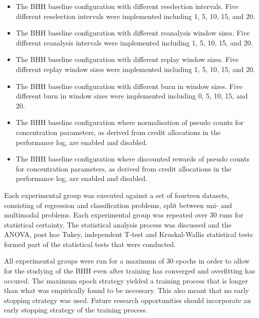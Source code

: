 \begin{itemize}
\begin{itemize}
                  \item The \acs{BHH} baseline configuration with different reselection intervals. Five different reselection intervals were implemented including 1, 5, 10, 15, and 20.

                  \item The \acs{BHH} baseline configuration with different reanalysis window sizes. Five different reanalysis intervals were implemented including 1, 5, 10, 15, and 20.

                  \item The \acs{BHH} baseline configuration with different replay window sizes. Five different replay window sizes were implemented including 1, 5, 10, 15, and 20.

                  \item The \acs{BHH} baseline configuration with different burn in window sizes. Five different burn in window sizes were implemented including 0, 5, 10, 15, and 20.

                  \item The \acs{BHH} baseline configuration where normalisation of pseudo counts for concentration parameters, as derived from credit allocations in the performance log, are enabled and disabled.

                  \item The \acs{BHH} baseline configuration where discounted rewards of pseudo counts for concentration parameters, as derived from credit allocations in the performance log, are enabled and disabled.
            \end{itemize}
\end{itemize}

Each experimental group was executed against a set of fourteen datasets, consisting of regression and classification problems, split between uni- and multimodal problems. Each experimental group was repeated over 30 runs for statistical certainty. The statistical analysis process was discussed and the ANOVA, post hoc Tukey, independent T-test and Kruskal-Wallis statistical tests formed part of the statistical tests that were conducted.

All experimental groups were run for a maximum of 30 epochs in order to allow for the studying of the \ac{BHH} even after training has converged and overfitting has occured. The maximum epoch strategy yielded a training process that is longer than what was empirically found to be necessary. This also meant that no early stopping strategy was used. Future research opportunities should incorporate an early stopping strategy of the training process.

